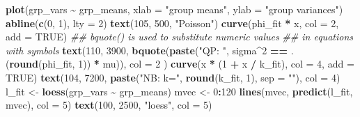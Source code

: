 \documentclass[
  12pt,
]{book}
\newenvironment{Shaded}{\begin{snugshade}}{\end{snugshade}}
\newcommand{\CommentTok}[1]{\textcolor[rgb]{0.56,0.35,0.01}{\textit{#1}}}
\newcommand{\DataTypeTok}[1]{\textcolor[rgb]{0.13,0.29,0.53}{#1}}
\newcommand{\DecValTok}[1]{\textcolor[rgb]{0.00,0.00,0.81}{#1}}
\newcommand{\KeywordTok}[1]{\textcolor[rgb]{0.13,0.29,0.53}{\textbf{#1}}}
\newcommand{\NormalTok}[1]{#1}
\newcommand{\OperatorTok}[1]{\textcolor[rgb]{0.81,0.36,0.00}{\textbf{#1}}}
\newcommand{\OtherTok}[1]{\textcolor[rgb]{0.56,0.35,0.01}{#1}}
\newcommand{\StringTok}[1]{\textcolor[rgb]{0.31,0.60,0.02}{#1}}
\begin{document}
\begin{Shaded}
\begin{Highlighting}[]
\KeywordTok{plot}\NormalTok{(grp\_vars }\OperatorTok{\textasciitilde{}}\StringTok{ }\NormalTok{grp\_means, }\DataTypeTok{xlab =} \StringTok{"group means"}\NormalTok{, }\DataTypeTok{ylab =} \StringTok{"group variances"}\NormalTok{)}
\KeywordTok{abline}\NormalTok{(}\KeywordTok{c}\NormalTok{(}\DecValTok{0}\NormalTok{, }\DecValTok{1}\NormalTok{), }\DataTypeTok{lty =} \DecValTok{2}\NormalTok{)}
\KeywordTok{text}\NormalTok{(}\DecValTok{105}\NormalTok{, }\DecValTok{500}\NormalTok{, }\StringTok{"Poisson"}\NormalTok{)}
\KeywordTok{curve}\NormalTok{(phi\_fit }\OperatorTok{*}\StringTok{ }\NormalTok{x, }\DataTypeTok{col =} \DecValTok{2}\NormalTok{, }\DataTypeTok{add =} \OtherTok{TRUE}\NormalTok{)}
\CommentTok{\#\# bquote() is used to substitute numeric values}
\CommentTok{\#\# in equations with symbols}
\KeywordTok{text}\NormalTok{(}\DecValTok{110}\NormalTok{, }\DecValTok{3900}\NormalTok{,}
  \KeywordTok{bquote}\NormalTok{(}\KeywordTok{paste}\NormalTok{(}\StringTok{"QP: "}\NormalTok{, sigma}\OperatorTok{\^{}}\DecValTok{2} \OperatorTok{==}\StringTok{ }\NormalTok{.(}\KeywordTok{round}\NormalTok{(phi\_fit, }\DecValTok{1}\NormalTok{)) }\OperatorTok{*}\StringTok{ }\NormalTok{mu)),}
  \DataTypeTok{col =} \DecValTok{2}
\NormalTok{)}
\KeywordTok{curve}\NormalTok{(x }\OperatorTok{*}\StringTok{ }\NormalTok{(}\DecValTok{1} \OperatorTok{+}\StringTok{ }\NormalTok{x }\OperatorTok{/}\StringTok{ }\NormalTok{k\_fit), }\DataTypeTok{col =} \DecValTok{4}\NormalTok{, }\DataTypeTok{add =} \OtherTok{TRUE}\NormalTok{)}
\KeywordTok{text}\NormalTok{(}\DecValTok{104}\NormalTok{, }\DecValTok{7200}\NormalTok{, }\KeywordTok{paste}\NormalTok{(}\StringTok{"NB: k="}\NormalTok{, }\KeywordTok{round}\NormalTok{(k\_fit, }\DecValTok{1}\NormalTok{), }\DataTypeTok{sep =} \StringTok{""}\NormalTok{), }\DataTypeTok{col =} \DecValTok{4}\NormalTok{)}
\NormalTok{l\_fit \textless{}{-}}\StringTok{ }\KeywordTok{loess}\NormalTok{(grp\_vars }\OperatorTok{\textasciitilde{}}\StringTok{ }\NormalTok{grp\_means)}
\NormalTok{mvec \textless{}{-}}\StringTok{ }\DecValTok{0}\OperatorTok{:}\DecValTok{120}
\KeywordTok{lines}\NormalTok{(mvec, }\KeywordTok{predict}\NormalTok{(l\_fit, mvec), }\DataTypeTok{col =} \DecValTok{5}\NormalTok{)}
\KeywordTok{text}\NormalTok{(}\DecValTok{100}\NormalTok{, }\DecValTok{2500}\NormalTok{, }\StringTok{"loess"}\NormalTok{, }\DataTypeTok{col =} \DecValTok{5}\NormalTok{)}
\end{Highlighting}
\end{Shaded}
\end{document}
